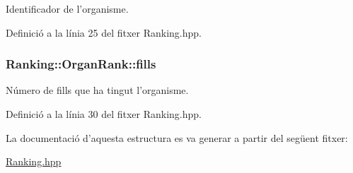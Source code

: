 Identificador de l'organisme. 



Definició a la línia 25 del fitxer Ranking.\-hpp.

\hypertarget{struct_ranking_1_1_organ_rank_a127f9a8768fd7cfda05c3cb2f9f8cfee}{
\subsubsection[{fills}]{\setlength{\rightskip}{0pt plus 5cm}Ranking\-::\-Organ\-Rank\-::fills}}\label{struct_ranking_1_1_organ_rank_a127f9a8768fd7cfda05c3cb2f9f8cfee}


Número de fills que ha tingut l'organisme. 



Definició a la línia 30 del fitxer Ranking.\-hpp.



La documentació d'aquesta estructura es va generar a partir del següent fitxer\-:\begin{DoxyCompactItemize}
\item 
\hyperlink{_ranking_8hpp}{Ranking.\-hpp}\end{DoxyCompactItemize}
